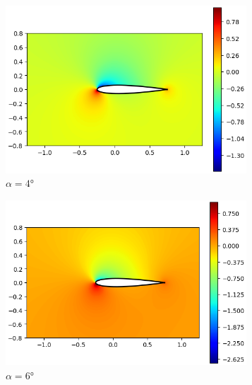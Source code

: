 \documentclass[letterpaper, openright, 12pt]{book}
\begin{document}
    \begin{figure}[htbp!]
        \centering
        \begin{subfigure}[c]{0.48\textwidth}
            \includegraphics[keepaspectratio, width=0.99\textwidth]
                {./img/potential_flow_cp_4}
            \caption{$\alpha = 4\si{\degree}$}
            \label{fig:potential_flow_cp_4}
        \end{subfigure}
        \hfill
        \begin{subfigure}[c]{0.48\textwidth}
            \includegraphics[keepaspectratio, width=0.99\textwidth]
                {./img/potential_flow_cp_6}
            \caption{$\alpha = 6\si{\degree}$}
            \label{fig:potential_flow_cp_6}
        \end{subfigure}
        \begin{subfigure}[c]{0.48\textwidth}

\end{subfigure}
\end{figure}
\end{document}
